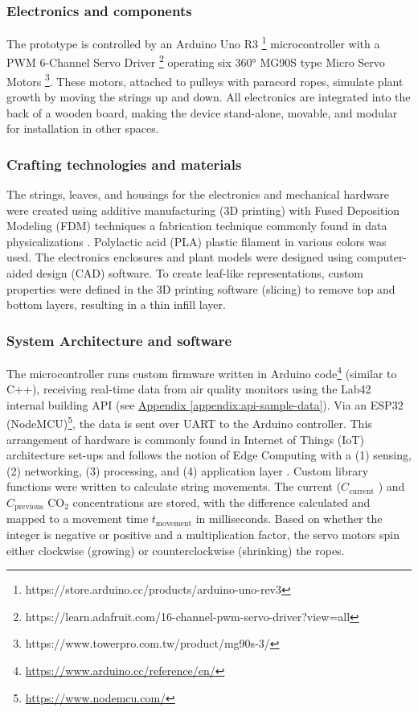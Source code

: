 \subsubsection{Electronics and components}

The prototype is controlled by an Arduino Uno R3 \footnote{https://store.arduino.cc/products/arduino-uno-rev3} microcontroller with a PWM 6-Channel Servo Driver \footnote{https://learn.adafruit.com/16-channel-pwm-servo-driver?view=all} operating six 360° MG90S type Micro Servo Motors \footnote{https://www.towerpro.com.tw/product/mg90s-3/}. These motors, attached to pulleys with paracord ropes, simulate plant growth by moving the strings up and down. All electronics are integrated into the back of a wooden board, making the device stand-alone, movable, and modular for installation in other spaces.

\subsubsection{Crafting technologies and materials}
The strings, leaves, and housings for the electronics and mechanical hardware were created using additive manufacturing (3D printing) with Fused Deposition Modeling (FDM) techniques a fabrication technique commonly found in data physicalizations \cite{anhalt_university_germany_design_2022}. Polylactic acid (PLA) plastic filament in various colors was used. The electronics enclosures and plant models were designed using computer-aided design (CAD) software. To create leaf-like representations, custom properties were defined in the 3D printing software (slicing) to remove top and bottom layers, resulting in a thin infill layer.

\subsubsection{System Architecture and software}

The microcontroller runs custom firmware written in Arduino code\footnote{\url{https://www.arduino.cc/reference/en/}} (similar to C++), receiving real-time data from air quality monitors using the Lab42 internal building API (see \hyperref[appendix:api-sample-data]{Appendix \ref*{appendix:api-sample-data}}). Via an ESP32 (NodeMCU)\footnote{\url{https://www.nodemcu.com/}}, the data is sent over UART to the Arduino controller. This arrangement of hardware is commonly found in Internet of Things (IoT) architecture set-ups and follows the notion of Edge Computing with a (1) sensing, (2) networking, (3) processing, and (4) application layer \cite{li_edge-oriented_2019, idrees_edge_2018}. Custom library functions were written to calculate string movements. The current (\( C_{\text{current}} \) ) and \( C_{\text{previous}} \) CO$_{2}$ concentrations are stored, with the difference calculated and mapped to a movement time \( t_{\text{movement}} \) in milliseconds. Based on whether the integer is negative or positive and a multiplication factor, the servo motors spin either clockwise (growing) or counterclockwise (shrinking) the ropes.


